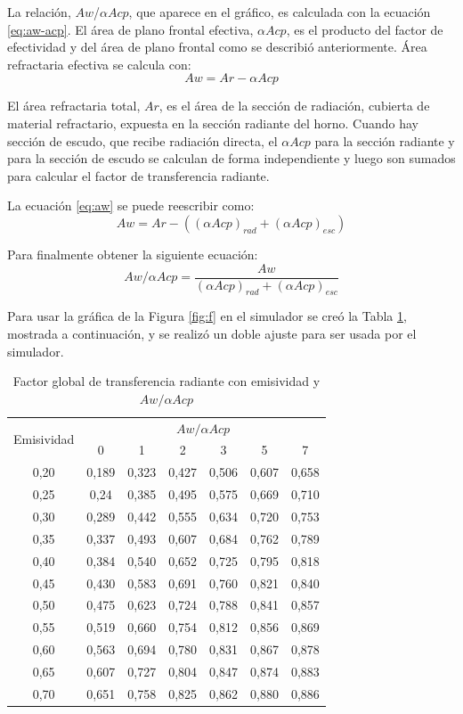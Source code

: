 \par La relación, $Aw$/$\alpha Acp$, que aparece en el gráfico, es calculada con la ecuación \ref{eq:aw-acp}. El área de plano frontal efectiva, $\alpha Acp$, es el producto del factor de efectividad y del área de plano frontal como se describió anteriormente. Área refractaria efectiva se calcula con:
\begin{equation} \label{eq:aw}
Aw = Ar - \alpha Acp
\end{equation}
\par El área refractaria total, $Ar$, es el área de la sección de radiación, cubierta de material refractario, expuesta en la sección radiante del horno. Cuando hay sección de escudo, que recibe radiación directa, el $\alpha Acp$ para la sección radiante y para la sección de escudo se calculan de forma independiente y luego son sumados para calcular el factor de transferencia radiante.
\par La ecuación \ref{eq:aw} se puede reescribir como:
\begin{equation}
Aw = Ar - ((\alpha Acp)_{rad} + (\alpha Acp)_{esc})   
\end{equation}
\par Para finalmente obtener la siguiente ecuación:
\begin{equation} \label{eq:aw-acp}
Aw/\alpha Acp = \frac{Aw}{(\alpha Acp)_{rad} + (\alpha Acp)_{esc}}
\end{equation}

\par Para usar la gráfica de la Figura \ref{fig:f} en el simulador se creó la Tabla \ref{tbl:f-fac}, mostrada a continuación, y se realizó un doble ajuste para ser usada por el simulador.
\begin{table}[H]
\caption{Factor global de transferencia radiante con emisividad y $Aw/\alpha Acp$}
\label{tbl:f-fac}
\centering
\begin{tabular}{c|c|c|c|c|c|c}
\multirow{2}{5em}{Emisividad}&\multicolumn{6}{c}{$Aw/\alpha Acp$}\\
        & 0	    & 1	    & 2	    & 3 	& 5	    & 7     \\
\hline
0,20    & 0,189	& 0,323	& 0,427	& 0,506	& 0,607	& 0,658 \\
0,25    & 0,24	& 0,385	& 0,495	& 0,575	& 0,669	& 0,710 \\
0,30	& 0,289	& 0,442	& 0,555	& 0,634	& 0,720	& 0,753 \\
0,35	& 0,337	& 0,493	& 0,607	& 0,684	& 0,762	& 0,789 \\
0,40	& 0,384	& 0,540	& 0,652	& 0,725	& 0,795	& 0,818 \\
0,45	& 0,430	& 0,583	& 0,691	& 0,760	& 0,821	& 0,840 \\
0,50	& 0,475	& 0,623	& 0,724	& 0,788	& 0,841	& 0,857 \\
0,55	& 0,519	& 0,660	& 0,754	& 0,812	& 0,856	& 0,869 \\
0,60	& 0,563	& 0,694	& 0,780	& 0,831	& 0,867	& 0,878 \\
0,65	& 0,607	& 0,727	& 0,804	& 0,847	& 0,874	& 0,883 \\
0,70	& 0,651	& 0,758	& 0,825	& 0,862	& 0,880	& 0,886 \\
\end{tabular}
\end{table}

